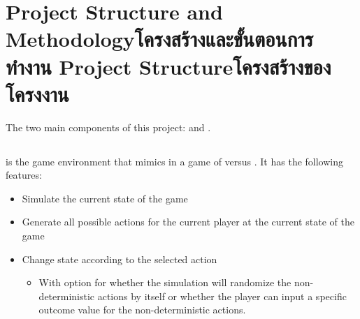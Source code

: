 \chapter{\ifproject%
\ifenglish Project Structure and Methodology\else โครงสร้างและขั้นตอนการทำงาน\fi
\else%
\ifenglish Project Structure\else โครงสร้างของโครงงาน\fi
\fi
}

The two main components of this project: \RootOurs{} and \RootAI.


\makeatletter


\makeatother

\section{\RootOurs}
\RootOurs{} is the game environment that mimics \RootV{} in a game of \Marquise{} versus \Eyrie. It has the following features:
\begin{itemize}
  \item Simulate the current state of the game
  \item Generate all possible actions for the current player at the current state of the game
  \item Change state according to the selected action 
  \begin{itemize}
    \item With option for whether the simulation will randomize the non-deterministic actions by itself or whether the player can input a specific outcome value for the non-deterministic actions.
  \end{itemize}
\end{itemize}


